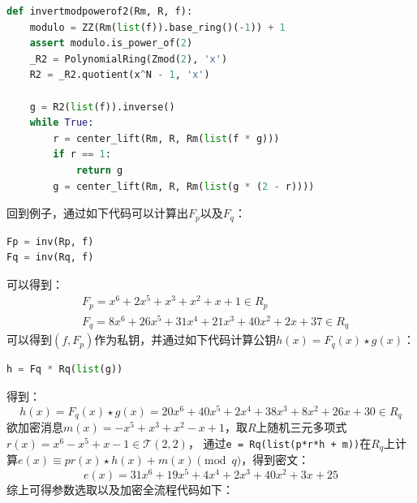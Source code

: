 \documentclass{book}
\numberwithin{equation}{subsubsection}
\begin{document}
\begin{lstlisting}[language=Python,basicstyle=\ttfamily,breaklines=true,keywordstyle=\bfseries\color{blue}]
def invertmodpowerof2(Rm, R, f):
    modulo = ZZ(Rm(list(f)).base_ring()(-1)) + 1
    assert modulo.is_power_of(2)
    _R2 = PolynomialRing(Zmod(2), 'x')
    R2 = _R2.quotient(x^N - 1, 'x')

    g = R2(list(f)).inverse()
    while True:
        r = center_lift(Rm, R, Rm(list(f * g)))
        if r == 1:
            return g
        g = center_lift(Rm, R, Rm(list(g * (2 - r))))
\end{lstlisting}
回到例子，通过如下代码可以计算出$F_p$以及$F_q$：
\begin{lstlisting}[language=Python,basicstyle=\ttfamily,breaklines=true,keywordstyle=\bfseries\color{blue}]
Fp = inv(Rp, f)
Fq = inv(Rq, f)
\end{lstlisting}
可以得到：
\begin{equation}
    \begin{aligned}
        &F_p=x^{6} + 2 x^{5} + x^{3} + x^{2} + x + 1\in R_p\\
        &F_q=8 x^{6} + 26 x^{5} + 31 x^{4} + 21 x^{3} + 40 x^{2} + 2 x + 37\in R_q
    \end{aligned}
    \nonumber
\end{equation}
可以得到$(f,F_p)$作为私钥，并通过如下代码计算公钥$h(x)=F_q(x)\star g(x)$：
\begin{lstlisting}[language=Python,basicstyle=\ttfamily,breaklines=true,keywordstyle=\bfseries\color{blue}]
h = Fq * Rq(list(g))
\end{lstlisting}
得到：
\begin{equation}
    h(x)=F_q(x)\star g(x)=20 x^{6} + 40 x^{5} + 2 x^{4} + 38 x^{3} + 8 x^{2} + 26 x + 30\in R_q
    \nonumber
\end{equation}
欲加密消息$m(x)=−x^5+x^3+x^2−x+1$，取$R$上随机三元多项式$r(x)=x^6 −x^5 +x−1\in\mathcal{T}(2,2)$，
通过\texttt{e = Rq(list(p*r*h + m))}在$R_q$上计算$e(x)\equiv pr(x)\star h(x)+m(x)\pmod{q}$，得到密文：
\begin{equation}
    e(x)=31 x^{6} + 19 x^{5} + 4 x^{4} + 2 x^{3} + 40 x^{2} + 3 x + 25
    \nonumber
\end{equation}
综上可得参数选取以及加密全流程代码如下：
\end{document}
